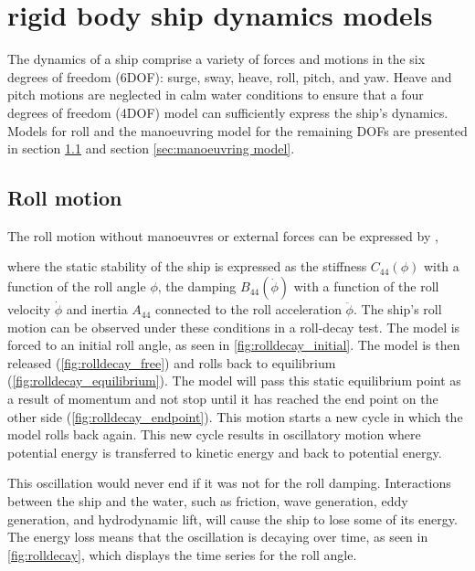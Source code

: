 \chapter{rigid body ship dynamics models}
\label{ch:models}

The dynamics of a ship comprise a variety of forces and motions in the six degrees of freedom (6DOF): surge, sway, heave, roll, pitch, and yaw. Heave and pitch motions are neglected in calm water conditions to ensure that a four degrees of freedom (4DOF) model can sufficiently express the ship's dynamics. Models for roll and the manoeuvring model for the remaining DOFs are presented in section \ref{sec:roll} and section \ref{sec:manoeuvring model}. 

\section{Roll motion} \label{sec:roll}
The roll motion without manoeuvres or external forces can be expressed by  \cite{himeno_prediction_1981},

\noindent where the static stability of the ship is expressed as the stiffness $C_{44}(\phi)$ with a function of the roll angle $\phi$, the damping $B_{44}(\dot{\phi})$ with a function of the roll velocity $\dot{\phi}$ and inertia $A_{44}$ connected to the roll acceleration $\ddot{\phi}$. The ship's roll motion can be observed under these conditions in a roll-decay test. The model is forced to an initial roll angle, as seen in \autoref{fig:rolldecay_initial}. The model is then released (\autoref{fig:rolldecay_free}) and rolls back to equilibrium (\autoref{fig:rolldecay_equilibrium}). The model will pass this static equilibrium point as a result of momentum and not stop until it has reached the end point on the other side (\autoref{fig:rolldecay_endpoint}). This motion starts a new cycle in which the model rolls back again. This new cycle results in oscillatory motion where potential energy is transferred to kinetic energy and back to potential energy.

\noindent This oscillation would never end if it was not for the roll damping. Interactions between the ship and the water, such as friction, wave generation, eddy generation, and hydrodynamic lift, will cause the ship to lose some of its energy. The energy loss means that the oscillation is decaying over time, as seen in \autoref{fig:rolldecay}, which displays the time series for the roll angle.

